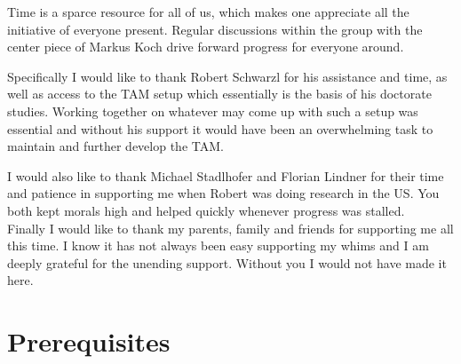 \documentclass[twoside,openright,listof=numbered]{scrreprt}
\begin{document}
Time is a sparce resource for all of us, which makes one appreciate all the initiative of everyone present. Regular discussions within the group with the center piece of Markus Koch drive forward progress for everyone around.

Specifically I would like to thank Robert Schwarzl for his assistance and time, as well as access to the TAM setup which essentially is the basis of his doctorate studies. Working together on whatever may come up with such a setup was essential and without his support it would have been an overwhelming task to maintain and further develop the TAM.


I would also like to thank Michael Stadlhofer and Florian Lindner for their time and patience in supporting me when Robert was doing research in the US. You both kept morals high and helped quickly whenever progress was stalled.\\


Finally I would like to thank my parents, family and friends for supporting me all this time. I know it has not always been easy supporting my whims and I am deeply grateful for the unending support. Without you I would not have made it here.

\tableofcontents


\chapter{Prerequisites}
\end{document}
